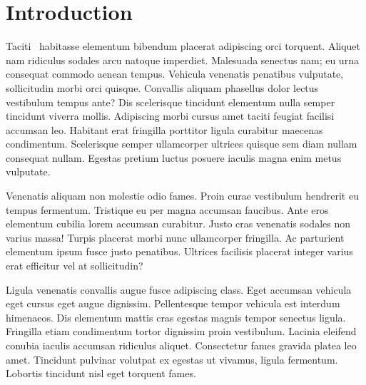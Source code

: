 \section{Introduction}
\label{sec:intro}

Taciti~\cite{76-toit-dh} habitasse elementum bibendum placerat adipiscing orci
torquent. Aliquet nam ridiculus sodales arcu natoque imperdiet. Malesuada
senectus nam; eu urna consequat commodo aenean tempus. Vehicula venenatis
penatibus vulputate, sollicitudin morbi orci quisque. Convallis aliquam
phasellus dolor lectus vestibulum tempus ante? Dis scelerisque tincidunt
elementum nulla semper tincidunt viverra mollis. Adipiscing morbi cursus amet
taciti feugiat facilisi accumsan leo. Habitant erat fringilla porttitor ligula
curabitur maecenas condimentum. Scelerisque semper ullamcorper ultrices quisque
sem diam nullam consequat nullam.  Egestas pretium luctus posuere iaculis magna
enim metus vulputate.

Venenatis aliquam non molestie odio fames. Proin curae vestibulum hendrerit eu
tempus fermentum. Tristique eu per magna accumsan faucibus. Ante eros elementum
cubilia lorem accumsan curabitur. Justo cras venenatis sodales non varius
massa! Turpis placerat morbi nunc ullamcorper fringilla. Ac parturient
elementum ipsum fusce justo penatibus. Ultrices facilisis placerat integer
varius erat efficitur vel at sollicitudin?

Ligula venenatis convallis augue fusce adipiscing class. Eget accumsan vehicula
eget cursus eget augue dignissim. Pellentesque tempor vehicula est interdum
himenaeos.  Dis elementum mattis cras egestas magnis tempor senectus
ligula. Fringilla etiam condimentum tortor dignissim proin vestibulum. Lacinia
eleifend conubia iaculis accumsan ridiculus aliquet. Consectetur fames gravida
platea leo amet. Tincidunt pulvinar volutpat ex egestas ut vivamus, ligula
fermentum. Lobortis tincidunt nisl eget torquent fames.

